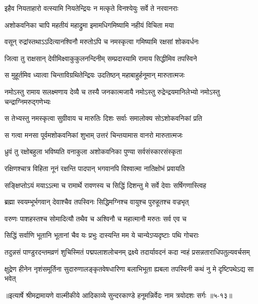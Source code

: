 \twolineshloka
{इहैव नियताहारो वत्स्यामि नियतेन्द्रियः}
{न मत्कृते विनश्येयुः सर्वे ते नरवानराः} %

\twolineshloka
{अशोकवनिका चापि महतीयं महाद्रुमा}
{इमामधिगमिष्यामि नहीयं विचिता मया} %

\twolineshloka
{वसून् रुद्रांस्तथाऽऽदित्यानश्विनौ मरुतोऽपि च}
{नमस्कृत्वा गमिष्यामि रक्षसां शोकवर्धनः} %

\twolineshloka
{जित्वा तु राक्षसान् देवीमिक्ष्वाकुकुलनन्दिनीम्}
{सम्प्रदास्यामि रामाय सिद्धीमिव तपस्विने} %

\twolineshloka
{स मुहूर्तमिव ध्यात्वा चिन्ताविग्रथितेन्द्रियः}
{उदतिष्ठन् महाबाहुर्हनूमान् मारुतात्मजः} %

\twolineshloka
{नमोऽस्तु रामाय सलक्ष्मणाय देव्यै च तस्यै जनकात्मजायै}
{नमोऽस्तु रुद्रेन्द्रयमानिलेभ्यो नमोऽस्तु चन्द्राग्निमरुद्गणेभ्यः} %

\twolineshloka
{स तेभ्यस्तु नमस्कृत्वा सुग्रीवाय च मारुतिः}
{दिशः सर्वाः समालोक्य सोऽशोकवनिकां प्रति} %

\twolineshloka
{स गत्वा मनसा पूर्वमशोकवनिकां शुभाम्}
{उत्तरं चिन्तयामास वानरो मारुतात्मजः} %

\twolineshloka
{ध्रुवं तु रक्षोबहुला भविष्यति वनाकुला}
{अशोकवनिका पुण्या सर्वसंस्कारसंस्कृता} %

\twolineshloka
{रक्षिणश्चात्र विहिता नूनं रक्षन्ति पादपान्}
{भगवानपि विश्वात्मा नातिक्षोभं प्रवायति} %

\twolineshloka
{सङ्क्षिप्तोऽयं मयाऽऽत्मा च रामार्थे रावणस्य च}
{सिद्धिं दिशन्तु मे सर्वे देवाः सर्षिगणास्त्विह} %

\twolineshloka
{ब्रह्मा स्वयम्भूर्भगवान् देवाश्चैव तपस्विनः}
{सिद्धिमग्निश्च वायुश्च पुरुहूतश्च वज्रभृत्} %

\twolineshloka
{वरुणः पाशहस्तश्च सोमादित्यौ तथैव च}
{अश्विनौ च महात्मानौ मरुतः सर्व एव च} %

\twolineshloka
{सिद्धिं सर्वाणि भूतानि भूतानां चैव यः प्रभुः}
{दास्यन्ति मम ये चान्येऽप्यदृष्टाः पथि गोचराः} %

\twolineshloka
{तदुन्नसं पाण्डुरदन्तमव्रणं शुचिस्मितं पद्मपलाशलोचनम्}
{द्रक्ष्ये तदार्यावदनं कदा न्वहं प्रसन्नताराधिपतुल्यवर्चसम्} %

\twolineshloka
{क्षुद्रेण हीनेन नृशंसमूर्तिना सुदारुणालङ्कृतवेषधारिणा}
{बलाभिभूता ह्यबला तपस्विनी कथं नु मे दृष्टिपथेऽद्य सा भवेत्} %


॥इत्यार्षे श्रीमद्रामायणे वाल्मीकीये आदिकाव्ये सुन्दरकाण्डे हनूमन्निर्वेदः नाम त्रयोदशः सर्गः ॥५-१३॥
